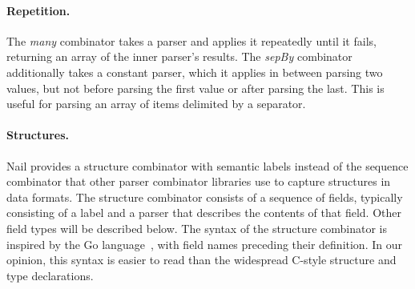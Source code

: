 \paragraph{Repetition.}

The \emph{many} combinator takes a parser and applies it repeatedly
until it fails, returning an array of the inner parser's results. The
\emph{sepBy} combinator
additionally takes a constant parser, which it applies in between parsing
two values, but not before parsing the first value or after parsing the
last.  This is useful for parsing an array of items delimited by a separator.

\paragraph{Structures.}




Nail provides a structure combinator with semantic labels instead of the sequence combinator that
other parser combinator libraries use to capture structures in data formats. 
The structure combinator consists of a sequence of fields, typically consisting of a label and a
parser that describes the contents of that field. Other field types will be described below.
 The syntax of the structure combinator is inspired by the Go language~\cite{golang}, with field names preceding their definition.
In our opinion, this syntax is easier to read than the widespread C-style structure and type
declarations.

